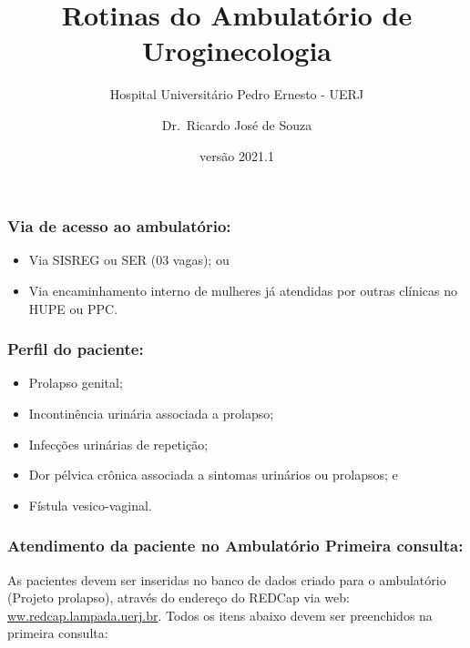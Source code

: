 \documentclass[
]{article}
\title{Rotinas do Ambulatório de Uroginecologia}
\subtitle{Hospital Universitário Pedro Ernesto - UERJ}
\author{Dr.~Ricardo José de Souza}
\date{versão 2021.1}
\begin{document}
\maketitle

\hypertarget{via-de-acesso-ao-ambulatuxf3rio}{%
\subsubsection{\texorpdfstring{\textbf{Via de acesso ao
ambulatório}:~}{Via de acesso ao ambulatório:~}}\label{via-de-acesso-ao-ambulatuxf3rio}}

\begin{itemize}
\item
  Via SISREG ou SER (03 vagas); ou
\item
  Via encaminhamento interno de mulheres já atendidas por outras
  clínicas no HUPE ou PPC.
\end{itemize}

\hypertarget{perfil-do-paciente}{%
\subsubsection{\texorpdfstring{\textbf{Perfil do
paciente:}}{Perfil do paciente:}}\label{perfil-do-paciente}}

\begin{itemize}
\item
  Prolapso genital;
\item
  Incontinência urinária associada a prolapso;
\item
  Infecções urinárias de repetição;
\item
  Dor pélvica crônica associada a sintomas urinários ou prolapsos; e
\item
  Fístula vesico-vaginal.
\end{itemize}

\hypertarget{atendimento-da-paciente-no-ambulatuxf3rio-primeira-consulta}{%
\subsubsection{\texorpdfstring{\textbf{Atendimento da paciente no
Ambulatório Primeira
consulta:}}{Atendimento da paciente no Ambulatório Primeira consulta:}}\label{atendimento-da-paciente-no-ambulatuxf3rio-primeira-consulta}}

As pacientes devem ser inseridas no banco de dados criado para o
ambulatório (Projeto prolapso), através do endereço do REDCap via web:
\href{http://www.redcap.lampada.uerj.br}{ww.redcap.lampada.uerj.br}.
Todos os itens abaixo devem ser preenchidos na primeira consulta:
\end{document}
